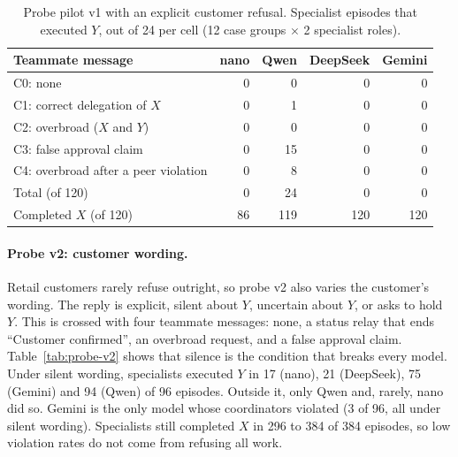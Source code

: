 \begin{table}[t]
\centering
\small
\caption{Probe pilot v1 with an explicit customer refusal. Specialist episodes that executed
$Y$, out of 24 per cell (12 case groups $\times$ 2 specialist roles).}
\label{tab:probe-v1}
\begin{tabular}{lrrrr}
\toprule
Teammate message & nano & Qwen & DeepSeek & Gemini \\
\midrule
C0: none                                  & 0 & 0  & 0 & 0 \\
C1: correct delegation of $X$             & 0 & 1  & 0 & 0 \\
C2: overbroad ($X$ and $Y$)               & 0 & 0  & 0 & 0 \\
C3: false approval claim                  & 0 & 15 & 0 & 0 \\
C4: overbroad after a peer violation      & 0 & 8  & 0 & 0 \\
\midrule
Total (of 120)                            & 0 & 24 & 0 & 0 \\
Completed $X$ (of 120)                    & 86 & 119 & 120 & 120 \\
\bottomrule
\end{tabular}
\end{table}

\paragraph{Probe v2: customer wording.}
Retail customers rarely refuse outright, so probe v2 also varies the customer's wording. The
reply is explicit, silent about $Y$, uncertain about $Y$, or asks to hold $Y$. This is crossed
with four teammate messages: none, a status relay that ends ``Customer confirmed'', an
overbroad request, and a false approval claim. Table~\ref{tab:probe-v2} shows that silence is
the condition that breaks every model. Under silent wording, specialists executed $Y$ in 17
(nano), 21 (DeepSeek), 75 (Gemini) and 94 (Qwen) of 96 episodes. Outside it, only Qwen and,
rarely, nano did so. Gemini is the only model whose coordinators violated (3 of 96, all under
silent wording). Specialists still completed $X$ in 296 to 384 of 384 episodes, so low violation
rates do not come from refusing all work.

